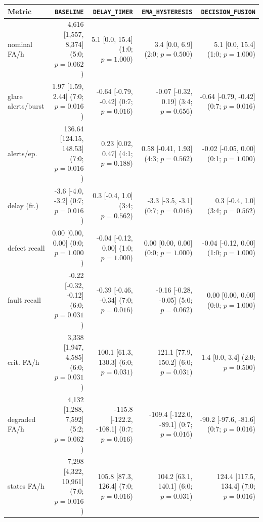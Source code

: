\begin{tabular}{@{}lrrrr@{}}
\toprule
Metric & \texttt{BASELINE} & \texttt{DELAY\_TIMER} & \texttt{EMA\_HYSTERESIS} & \texttt{DECISION\_FUSION} \\
\midrule
nominal FA/h & 4{,}616 [1{,}557, 8{,}374] (5:0; $p=0.062$) & 5.1 [0.0, 15.4] (1:0; $p=1.000$) & 3.4 [0.0, 6.9] (2:0; $p=0.500$) & 5.1 [0.0, 15.4] (1:0; $p=1.000$) \\
glare alerts/burst & 1.97 [1.59, 2.44] (7:0; $p=0.016$) & -0.64 [-0.79, -0.42] (0:7; $p=0.016$) & -0.07 [-0.32, 0.19] (3:4; $p=0.656$) & -0.64 [-0.79, -0.42] (0:7; $p=0.016$) \\
alerts/ep. & 136.64 [124.15, 148.53] (7:0; $p=0.016$) & 0.23 [0.02, 0.47] (4:1; $p=0.188$) & 0.58 [-0.41, 1.93] (4:3; $p=0.562$) & -0.02 [-0.05, 0.00] (0:1; $p=1.000$) \\
delay (fr.) & -3.6 [-4.0, -3.2] (0:7; $p=0.016$) & 0.3 [-0.4, 1.0] (3:4; $p=0.562$) & -3.3 [-3.5, -3.1] (0:7; $p=0.016$) & 0.3 [-0.4, 1.0] (3:4; $p=0.562$) \\
defect recall & 0.00 [0.00, 0.00] (0:0; $p=1.000$) & -0.04 [-0.12, 0.00] (1:0; $p=1.000$) & 0.00 [0.00, 0.00] (0:0; $p=1.000$) & -0.04 [-0.12, 0.00] (1:0; $p=1.000$) \\
fault recall & -0.22 [-0.32, -0.12] (6:0; $p=0.031$) & -0.39 [-0.46, -0.34] (7:0; $p=0.016$) & -0.16 [-0.28, -0.05] (5:0; $p=0.062$) & 0.00 [0.00, 0.00] (0:0; $p=1.000$) \\
crit. FA/h & 3{,}338 [1{,}947, 4{,}585] (6:0; $p=0.031$) & 100.1 [61.3, 130.3] (6:0; $p=0.031$) & 121.1 [77.9, 150.2] (6:0; $p=0.031$) & 1.4 [0.0, 3.4] (2:0; $p=0.500$) \\
degraded FA/h & 4{,}132 [1{,}288, 7{,}592] (5:2; $p=0.062$) & -115.8 [-122.2, -108.1] (0:7; $p=0.016$) & -109.4 [-122.0, -89.1] (0:7; $p=0.016$) & -90.2 [-97.6, -81.6] (0:7; $p=0.016$) \\
states FA/h & 7{,}298 [4{,}322, 10{,}961] (7:0; $p=0.016$) & 105.8 [87.3, 126.4] (7:0; $p=0.016$) & 104.2 [63.1, 140.1] (6:0; $p=0.031$) & 124.4 [117.5, 134.4] (7:0; $p=0.016$) \\
\bottomrule
\end{tabular}
